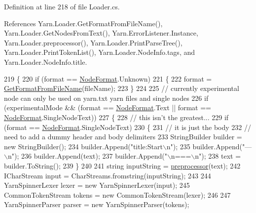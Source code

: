 Definition at line 218 of file Loader.\-cs.



References Yarn.\-Loader.\-Get\-Format\-From\-File\-Name(), Yarn.\-Loader.\-Get\-Nodes\-From\-Text(), Yarn.\-Error\-Listener.\-Instance, Yarn.\-Loader.\-preprocessor(), Yarn.\-Loader.\-Print\-Parse\-Tree(), Yarn.\-Loader.\-Print\-Token\-List(), Yarn.\-Loader.\-Node\-Info.\-tags, and Yarn.\-Loader.\-Node\-Info.\-title.


\begin{DoxyCode}
219         \{
220             \textcolor{keywordflow}{if} (format == \hyperlink{a00051_ad7ebb46e7309ead8767383a672b3272f}{NodeFormat}.Unknown)
221             \{
222                 format = \hyperlink{a00133_a080b2d6b7553c178007c04297d50e9da}{GetFormatFromFileName}(fileName);
223             \}
224 
225             \textcolor{comment}{// currently experimental node can only be used on yarn.txt yarn files and single nodes}
226             \textcolor{keywordflow}{if} (experimentalMode && (format == \hyperlink{a00051_ad7ebb46e7309ead8767383a672b3272f}{NodeFormat}.Text || format == 
      \hyperlink{a00051_ad7ebb46e7309ead8767383a672b3272f}{NodeFormat}.SingleNodeText))
227             \{
228                 \textcolor{comment}{// this isn't the greatest...}
229                 \textcolor{keywordflow}{if} (format == \hyperlink{a00051_ad7ebb46e7309ead8767383a672b3272f}{NodeFormat}.SingleNodeText)
230                 \{
231                     \textcolor{comment}{// it is just the body}
232                     \textcolor{comment}{// need to add a dummy header and body delimiters}
233                     StringBuilder builder = \textcolor{keyword}{new} StringBuilder();
234                     builder.Append(\textcolor{stringliteral}{"title:Start\(\backslash\)n"});
235                     builder.Append(\textcolor{stringliteral}{"---\(\backslash\)n"});
236                     builder.Append(text);
237                     builder.Append(\textcolor{stringliteral}{"\(\backslash\)n===\(\backslash\)n"});
238                     text = builder.ToString();
239                 \}
240 
241                 \textcolor{keywordtype}{string} inputString = \hyperlink{a00133_a0b09a29edd2ed13d52203f1b71a47081}{preprocessor}(text);
242                 ICharStream input = CharStreams.fromstring(inputString);
243 
244                 YarnSpinnerLexer lexer = \textcolor{keyword}{new} YarnSpinnerLexer(input);
245                 CommonTokenStream tokens = \textcolor{keyword}{new} CommonTokenStream(lexer);
246 
247                 YarnSpinnerParser parser = \textcolor{keyword}{new} YarnSpinnerParser(tokens);

\end{DoxyCode}
